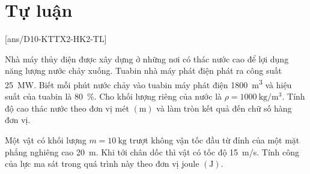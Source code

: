 \section{Tự luận}
\setcounter{ex}{0}
[ans/D10-KTTX2-HK2-TL]
\begin{ex}
	Nhà máy thủy điện được xây dựng ở những nơi có thác nước cao để lợi dụng năng lượng nước chảy xuống. Tuabin nhà máy phát điện phát ra công suất \SI{25}{\mega\watt}. Biết mỗi phút nước chảy vào tuabin máy phát điện \SI{1800}{\meter^3} và hiệu suất của tuabin là \SI{80}{\percent}. Cho khối lượng riêng của nước là $\rho=\SI{1000}{\kilogram/\meter^3}$. Tính độ cao thác nước theo đơn vị mét $\left(\si{\meter}\right)$ và làm tròn kết quả đến chữ số hàng đơn vị.
	\loigiai{
		
	}
\end{ex}
\begin{ex}
	Một vật có khối lượng $m=\SI{10}{\kilogram}$ trượt không vận tốc đầu từ đỉnh của một mặt phẳng nghiêng cao \SI{20}{\meter}. Khi tới chân dốc thì vật có tốc độ \SI{15}{\meter/\second}. Tính công của lực ma sát trong quá trình này theo đơn vị joule $\left(\si{\joule}\right)$.
\end{ex}
